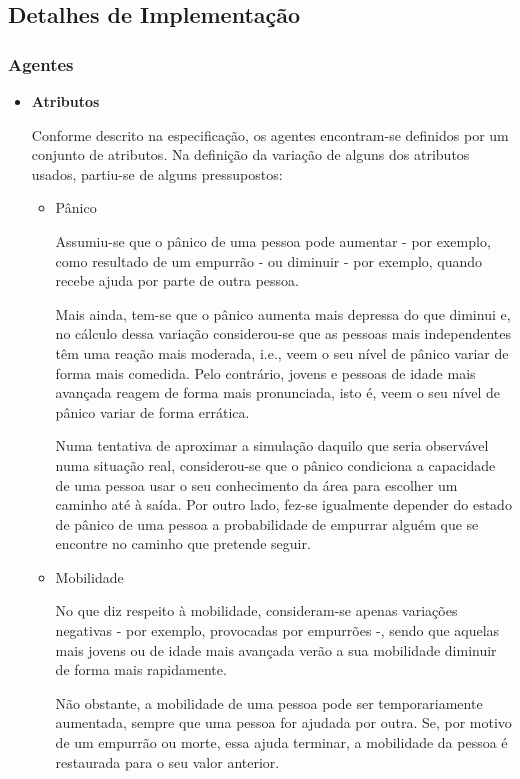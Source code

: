 \documentclass[12pt]{article}
\begin{document}
\begin{titlepage}
\newpage
\subsection{Detalhes de Implementação}
\subsubsection{Agentes}

\begin{itemize}
	
\item \textbf{Atributos}

Conforme descrito na especificação, os agentes encontram-se definidos por um conjunto de atributos.
Na definição da variação de alguns dos atributos usados, partiu-se de alguns pressupostos:

\begin{itemize}
\item Pânico

Assumiu-se que o pânico de uma pessoa pode aumentar - por exemplo, como resultado de um empurrão - ou diminuir - por exemplo, quando recebe ajuda por parte de outra pessoa. 

Mais ainda, tem-se que o pânico aumenta mais depressa do que diminui e, no cálculo dessa variação considerou-se que as pessoas mais independentes têm uma reação mais moderada, i.e., veem o seu nível de pânico variar de forma mais comedida. Pelo contrário, jovens e pessoas de idade mais avançada reagem de forma mais pronunciada, isto é, veem o seu nível de pânico variar de forma errática.

Numa tentativa de aproximar a simulação daquilo que seria observável numa situação real, considerou-se que o pânico condiciona a capacidade de uma pessoa usar o seu conhecimento da área para escolher um caminho até à saída. Por outro lado, fez-se igualmente depender do estado de pânico de uma pessoa a probabilidade de empurrar alguém que se encontre no caminho que pretende seguir.\newline


\item Mobilidade

No que diz respeito à mobilidade, consideram-se apenas variações negativas - por exemplo, provocadas por empurrões -, sendo que aquelas mais jovens ou de idade mais avançada verão a sua mobilidade diminuir de forma mais rapidamente.

Não obstante, a mobilidade de uma pessoa pode ser temporariamente aumentada, sempre que uma pessoa for ajudada por outra. Se, por motivo de um empurrão ou morte, essa ajuda terminar, a mobilidade da pessoa é restaurada para o seu valor anterior.


\end{itemize}
\end{itemize}
\end{titlepage}
\end{document}
